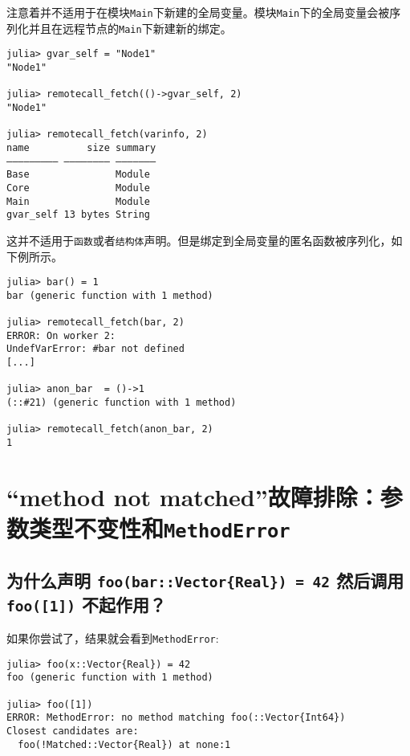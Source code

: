 注意着并不适用于在模块\texttt{Main}下新建的全局变量。模块\texttt{Main}下的全局变量会被序列化并且在远程节点的\texttt{Main}下新建新的绑定。




\begin{verbatim}
julia> gvar_self = "Node1"
"Node1"

julia> remotecall_fetch(()->gvar_self, 2)
"Node1"

julia> remotecall_fetch(varinfo, 2)
name          size summary
––––––––– –––––––– –––––––
Base               Module
Core               Module
Main               Module
gvar_self 13 bytes String
\end{verbatim}



这并不适用于\texttt{函数}或者\texttt{结构体}声明。但是绑定到全局变量的匿名函数被序列化，如下例所示。




\begin{verbatim}
julia> bar() = 1
bar (generic function with 1 method)

julia> remotecall_fetch(bar, 2)
ERROR: On worker 2:
UndefVarError: #bar not defined
[...]

julia> anon_bar  = ()->1
(::#21) (generic function with 1 method)

julia> remotecall_fetch(anon_bar, 2)
1
\end{verbatim}



\hypertarget{799645384386008726}{}


\section{“method not matched”故障排除：参数类型不变性和\texttt{MethodError}}



\hypertarget{6536932508769855811}{}


\subsection{为什么声明 \texttt{foo(bar::Vector\{Real\}) = 42} 然后调用 \texttt{foo([1])} 不起作用？}



如果你尝试了，结果就会看到\texttt{MethodError}:




\begin{verbatim}
julia> foo(x::Vector{Real}) = 42
foo (generic function with 1 method)

julia> foo([1])
ERROR: MethodError: no method matching foo(::Vector{Int64})
Closest candidates are:
  foo(!Matched::Vector{Real}) at none:1
\end{verbatim}




